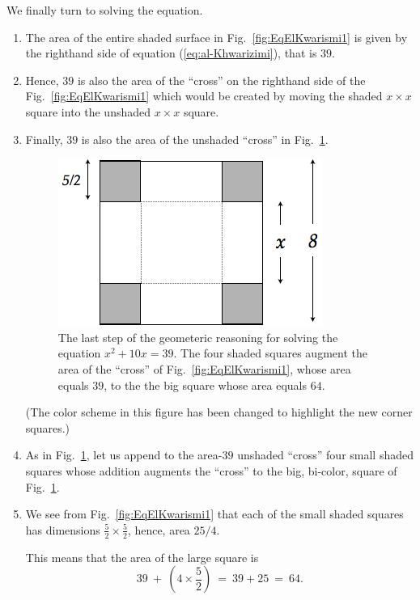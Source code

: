 We finally turn to solving the equation.
\begin{enumerate}
\item
The area of the entire shaded surface in Fig.~\ref{fig:EqElKwarismi1}
is given by the righthand side of equation (\ref{eq:al-Khwarizimi}),
that is $39$.
\item
Hence, $39$ is also the area of the ``cross'' on the righthand side of
the Fig.~\ref{fig:EqElKwarismi1} which would be created by moving the
shaded $x \times x$ square into the unshaded $x \times x$ square.
\item
Finally, $39$ is also the area of the unshaded ``cross'' in
Fig.~\ref{fig:EqElKwarismi2}.
\begin{figure}[ht]
\begin{center}
       \includegraphics[scale=0.4]{FiguresArithmetic/EquationElKwarismi2}
\caption{The last step of the geometeric reasoning for solving the
  equation $x^2 + 10x = 39$.  The four shaded squares augment the area
  of the ``cross'' of Fig.~\ref{fig:EqElKwarismi1}, whose area equals
  $39$, to the the big square whose area equals $64$.}
       \label{fig:EqElKwarismi2}
\end{center}
\end{figure}
(The color scheme in this figure has been changed to highlight the new
corner squares.)

\item
As in Fig.~\ref{fig:EqElKwarismi2}, let us append to the area-$39$
unshaded ``cross'' four small shaded squares whose addition augments
the ``cross'' to the big, bi-color, square of
Fig.~\ref{fig:EqElKwarismi2}.

\item
We see from Fig.~\ref{fig:EqElKwarismi1} that each of the small
shaded squares has dimensions $\frac{5}{2} \times \frac{5}{2}$, hence,
area $25/4$.

This means that the area of the large square is
\[ 39 \ + \ \left( 4 \times \frac{5}{2} \right) \ = \ 39 + 25 \ =
\ 64. \]
\end{enumerate}

